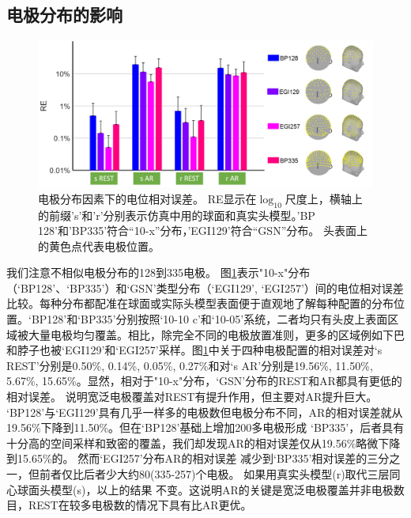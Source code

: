 \subsection{电极分布的影响}
\begin{figure}[!ht]
	\centering
	\includegraphics[width=\linewidth]{pic/JNE/figure5.png}
	\caption{电极分布因素下的电位相对误差。 RE显示在$\log_{10}$尺度上，横轴上的前缀's'和'r'分别表示仿真中用的球面和真实头模型。'BP
	128'和'BP335'符合“10-x”分布，'EGI129'符合“GSN”分布。 头表面上的黄色点代表电极位置。}
	\label{2:layre}
\end{figure}
我们注意不相似电极分布的128到335电极。 图\ref{2:layre}表示"10-x"分布（‘BP128’、‘BP335’）和‘GSN’类型分布（‘EGI129’, ‘EGI257’）间的电位相对误差比较。每种分布都配准在球面或实际头模型表面便于直观地了解每种配置的分布位置。‘BP128’和‘BP335’分别按照‘10-10 c’和‘10-05’系统，二者均只有头皮上表面区域被大量电极均匀覆盖。相比，除完全不同的电极放置准则，更多的区域例如下巴和脖子也被‘EGI129’和‘EGI257’采样。图\ref{2:layre}中关于四种电极配置的相对误差对‘s REST’分别是0.50\%, 0.14\%, 0.05\%, 0.27\%和对‘s AR’分别是19.56\%, 11.50\%, 5.67\%, 15.65\%。显然，相对于"10-x"分布，‘GSN’分布的REST和AR都具有更低的相对误差。 说明宽泛电极覆盖对REST有提升作用，但主要对AR提升巨大。
‘BP128’与‘EGI129’具有几乎一样多的电极数但电极分布不同，AR的相对误差就从19.56\%下降到11.50\%。但在‘BP128’基础上增加200多电极形成
‘BP335’，后者具有十分高的空间采样和致密的覆盖，我们却发现AR的相对误差仅从19.56\%略微下降到15.65\%的。 然而‘EGI257’分布AR的相对误差
减少到‘BP335’相对误差的三分之一，但前者仅比后者少大约80(335-257)个电极。 如果用真实头模型(r)取代三层同心球面头模型(s)，以上的结果
不变。这说明AR的关键是宽泛电极覆盖并非电极数目，REST在较多电极数的情况下具有比AR更优。

